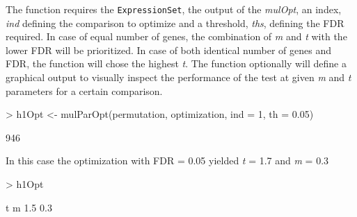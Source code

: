 \documentclass[a4paper]{article}
\begin{document}
The function  requires the \texttt{ExpressionSet}, the output of the \emph{mulOpt}, an
index, \emph{ind} defining the comparison to optimize and a threshold, \emph{ths}, 
defining the  FDR required. In case of equal number of genes, the combination of \emph{m} and \emph{t} with 
the lower FDR will be prioritized. In case of both identical number of genes and FDR, 
the function will chose the highest \emph{t}. The function optionally will define a graphical
output to visually inspect  the performance of the test at given \emph{m} and 
\emph{t} parameters for a certain comparison. 
\begin{Schunk}
\begin{Sinput}
> h1Opt <- mulParOpt(permutation, optimization, ind = 1, th = 0.05)
\end{Sinput}
\begin{Soutput}
[1] 946
\end{Soutput}
\end{Schunk}
In this case the optimization with FDR = 0.05 yielded \emph{t} = 1.7 and \emph{m} = 0.3
\begin{Schunk}
\begin{Sinput}
> h1Opt
\end{Sinput}
\begin{Soutput}
  t   m 
1.5 0.3 
\end{Soutput}
\end{Schunk}
\end{document}
